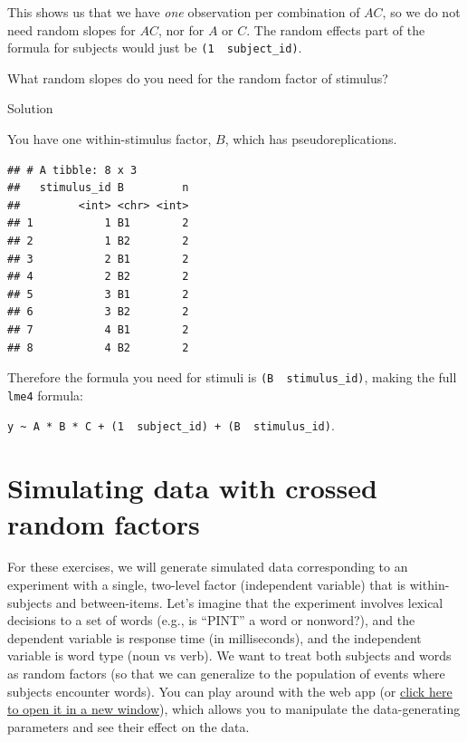 \documentclass[]{book}
\newenvironment{Shaded}{\begin{snugshade}}{\end{snugshade}}
\newcommand{\KeywordTok}[1]{\textcolor[rgb]{0.13,0.29,0.53}{\textbf{#1}}}
\newcommand{\NormalTok}[1]{#1}
\newcommand{\OperatorTok}[1]{\textcolor[rgb]{0.81,0.36,0.00}{\textbf{#1}}}
\newcommand{\StringTok}[1]{\textcolor[rgb]{0.31,0.60,0.02}{#1}}
\begin{document}
This shows us that we have \emph{one} observation per combination of \(AC\), so we do not need random slopes for \(AC\), nor for \(A\) or \(C\). The random effects part of the formula for subjects would just be \texttt{(1\ \textbar{}\ subject\_id)}.

What random slopes do you need for the random factor of stimulus?

Solution

You have one within-stimulus factor, \(B\), which has pseudoreplications.

\begin{Shaded}
\end{Shaded}

\begin{verbatim}
## # A tibble: 8 x 3
##   stimulus_id B         n
##         <int> <chr> <int>
## 1           1 B1        2
## 2           1 B2        2
## 3           2 B1        2
## 4           2 B2        2
## 5           3 B1        2
## 6           3 B2        2
## 7           4 B1        2
## 8           4 B2        2
\end{verbatim}

Therefore the formula you need for stimuli is \texttt{(B\ \textbar{}\ stimulus\_id)}, making the full \texttt{lme4} formula:

\texttt{y\ \textasciitilde{}\ A\ *\ B\ *\ C\ +\ (1\ \textbar{}\ subject\_id)\ +\ (B\ \textbar{}\ stimulus\_id)}.

\hypertarget{simulating-data-with-crossed-random-factors}{%
\section{Simulating data with crossed random factors}\label{simulating-data-with-crossed-random-factors}}

For these exercises, we will generate simulated data corresponding to an experiment with a single, two-level factor (independent variable) that is within-subjects and between-items. Let's imagine that the experiment involves lexical decisions to a set of words (e.g., is ``PINT'' a word or nonword?), and the dependent variable is response time (in milliseconds), and the independent variable is word type (noun vs verb). We want to treat both subjects and words as random factors (so that we can generalize to the population of events where subjects encounter words). You can play around with the web app (or \href{https://shiny.psy.gla.ac.uk/Dale/crossed}{click here to open it in a new window}), which allows you to manipulate the data-generating parameters and see their effect on the data.
\end{document}
